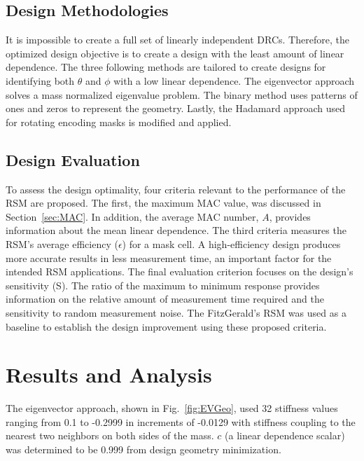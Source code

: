 \documentclass[twocolumn,10pt,final]{asme2ej}
\begin{document}
\vspace{-0.2 cm}
\subsection{Design Methodologies} \label{design-methods}
It is impossible to create a full set of linearly independent DRCs.  
Therefore, the optimized design objective is to create a design with the least amount of linear dependence.  
The three following methods are tailored to create designs for identifying both $\theta$ and $\phi$ with a low linear dependence.  
The eigenvector approach solves a mass normalized eigenvalue problem.  
The binary method uses patterns of ones and zeros to represent the geometry.
Lastly, the Hadamard approach used for rotating encoding masks is modified and applied.

\vspace{-0.2 cm}
\subsection{Design Evaluation}
\label{sec:Eval}
To assess the design optimality, four criteria relevant to the performance of the RSM are proposed.  The first, the maximum MAC value, was discussed in Section~\ref{sec:MAC}.  
In addition, the average MAC number, $A$, provides information about the mean linear dependence.  
The third criteria measures the RSM's average efficiency ($\epsilon$) for a mask cell. 
A high-efficiency design produces more accurate results in less measurement time, an important factor for the intended RSM applications.  
The final evaluation criterion focuses on the design's sensitivity (S).  
The ratio of the maximum to minimum response provides information on the relative amount of measurement time required and the  sensitivity to random measurement noise.
The FitzGerald's RSM was used as a baseline to establish the design improvement using these proposed criteria.  

\vspace{-0.3 cm}
\section{Results and Analysis}
The eigenvector approach, shown in Fig.~\ref{fig:EVGeo}, used 32 stiffness values ranging from 0.1 to -0.2999 in increments of -0.0129 with stiffness coupling to the nearest two neighbors on both sides of the mass.
$c$ (a linear dependence scalar) was determined to be 0.999 from design geometry minimization.
\end{document}
